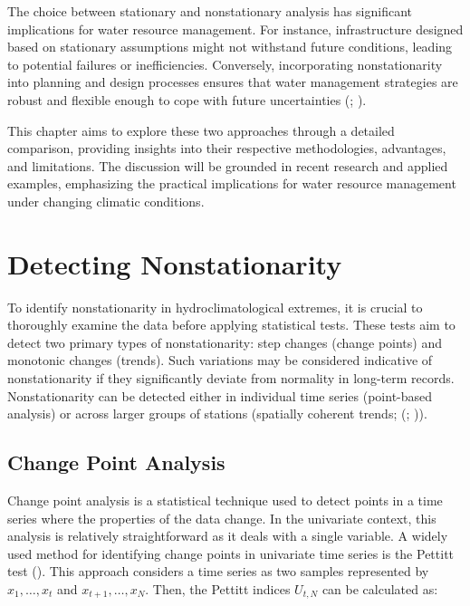 \documentclass[
]{krantz}
\begin{document}
The choice between stationary and nonstationary analysis has significant implications for water resource management. For instance, infrastructure designed based on stationary assumptions might not withstand future conditions, leading to potential failures or inefficiencies. Conversely, incorporating nonstationarity into planning and design processes ensures that water management strategies are robust and flexible enough to cope with future uncertainties (\citet{Milly2008}; \citet{Katz2013}).

This chapter aims to explore these two approaches through a detailed comparison, providing insights into their respective methodologies, advantages, and limitations. The discussion will be grounded in recent research and applied examples, emphasizing the practical implications for water resource management under changing climatic conditions.

\section{Detecting Nonstationarity}\label{detecting-nonstationarity}

To identify nonstationarity in hydroclimatological extremes, it is crucial to thoroughly examine the data before applying statistical tests. These tests aim to detect two primary types of nonstationarity: step changes (change points) and monotonic changes (trends). Such variations may be considered indicative of nonstationarity if they significantly deviate from normality in long-term records. Nonstationarity can be detected either in individual time series (point-based analysis) or across larger groups of stations (spatially coherent trends; (\citet{Hall2014}; \citet{Slater2021})).

\subsection{Change Point Analysis}\label{change-point-analysis}

Change point analysis is a statistical technique used to detect points in a time series where the properties of the data change. In the univariate context, this analysis is relatively straightforward as it deals with a single variable. A widely used method for identifying change points in univariate time series is the Pettitt test (\citet{Pettitt1979}). This approach considers a time series as two samples represented by \(x_{1}, \ldots, x_{t}\) and \(x_{t+1}, \ldots, x_{N}\). Then, the Pettitt indices \(U_{t, N}\) can be calculated as:
\end{document}
